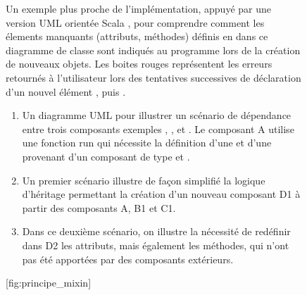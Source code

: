 
\cite{}
\begin{figure}[!p]
	\begin{sidecaption}{Un exemple plus proche de l'implémentation, appuyé par une version UML orientée Scala \autocite{Rachimow2009}, pour comprendre comment les élements manquants (attributs, méthodes) définis en  dans ce diagramme de classe sont indiqués au programme lors de la création de nouveaux objets. Les boites rouges représentent les erreurs retournés à l'utilisateur lors des tentatives successives de déclaration d'un nouvel élément , puis . \parbox{\marginparwidth}{
\begin{enumerate}[label=(\alph*),labelindent=\parindent,leftmargin=*]
       \item Un diagramme UML pour illustrer un scénario de dépendance entre trois composants exemples , , et . Le composant A utilise une fonction run qui nécessite la définition d'une  et d'une  provenant d'un composant de type  et .
       \item Un premier scénario illustre de façon simplifié la logique d'héritage permettant la création d'un nouveau composant D1 à partir des composants A, B1 et C1.
       \item Dans ce deuxième scénario, on illustre la nécessité de redéfinir dans D2 les attributs, mais également les méthodes, qui n'ont pas été apportées par des composants extérieurs.
\end{enumerate}}}[fig:principe_mixin]
	\centering
	\end{sidecaption}
\end{figure}

\pagebreak

